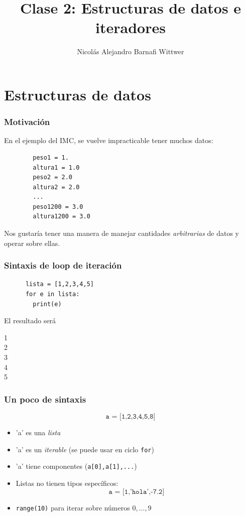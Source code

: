 \documentclass[14pt,aspectratio=169,xcolor=dvipsnames]{beamer}
\title[short title]{Clase 2: Estructuras de datos e iteradores}
\subtitle{}
\author[NA Barnafi] {Nicolás Alejandro Barnafi Wittwer}
\institute[UC|CMM] 
{
    Pontificia Universidad Católica de Chile \\
    Centro de Modelamiento Matemático
}
\date{}
\begin{document}
\begin{frame}
    \maketitle
\end{frame}
\section{Estructuras de datos}
\begin{frame}[fragile]\frametitle{Motivación}
En el ejemplo del IMC, se vuelve impracticable tener muchos datos:
    \begin{verbatim}
        peso1 = 1.
        altura1 = 1.0
        peso2 = 2.0 
        altura2 = 2.0
        ...
        peso1200 = 3.0
        altura1200 = 3.0
    \end{verbatim}

Nos gustaría tener una manera de manejar cantidades \emph{arbitrarias} de datos y operar sobre ellas.
\end{frame}
\begin{frame}[fragile]\frametitle{Sintaxis de loop de iteración}
    \begin{verbatim}
      lista = [1,2,3,4,5]
      for e in lista:
        print(e)
    \end{verbatim}
\pause El resultado será

1\\
2\\
3\\
4\\
5
\end{frame}
\begin{frame}\frametitle{Un poco de sintaxis}
    $$ \texttt{a = [1,2,3,4,5,8]} $$
    \begin{itemize}
        \item<+-> 'a' es una \emph{lista}
        \item<+-> 'a' es un \emph{iterable} (se puede usar en ciclo \texttt{for})
        \item<+-> 'a' tiene componentes (\texttt{a[0],a[1],...})
        \item<+-> Listas no tienen tipos específicos: 
            $$ \texttt{a = [1,'hola',-7.2]} $$
        \item<+-> \texttt{range(10)} para iterar sobre números $0,\dots,9$
    \end{itemize}
\end{frame}
\end{document}
